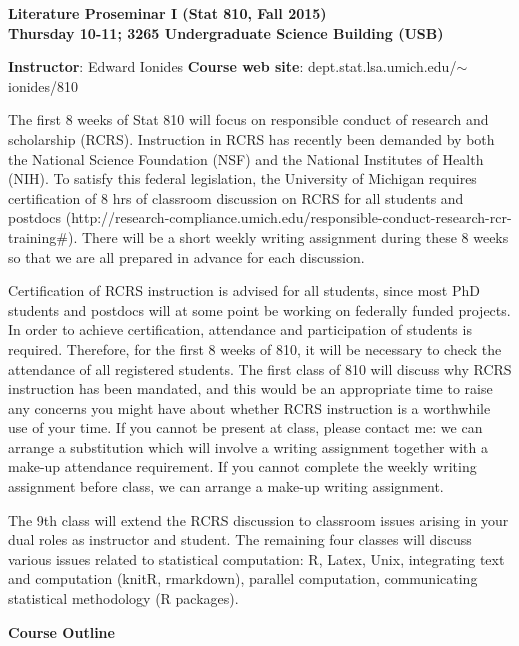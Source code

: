 \documentclass[11pt]{article}\usepackage[]{graphicx}\usepackage[]{color}
\begin{document}
\begin{center}\bf\Large
Literature Proseminar I (Stat 810, Fall 2015) \\
\rm \normalsize Thursday 10-11; 3265 Undergraduate Science Building (USB)
\end{center}
{\bf Instructor}: Edward Ionides \hfill
{\bf Course web site}: dept.stat.lsa.umich.edu/$\sim$ionides/810


\vspace{3mm}

The first 8 weeks of Stat 810 will focus on responsible conduct of research and scholarship (RCRS). Instruction in RCRS has recently been demanded by both the National Science Foundation (NSF) and the National Institutes of Health (NIH). To satisfy this federal legislation, the University of Michigan requires certification of 8 hrs of classroom discussion on RCRS for all students and postdocs (http://research-compliance.umich.edu/responsible-conduct-research-rcr-training\#). There will be a short weekly writing assignment during these 8 weeks so that we are all prepared in advance for each discussion.

 Certification of RCRS instruction is advised for all students, since most PhD students and postdocs will at some point be working on federally funded projects. In order to achieve certification, attendance and participation of students is required. Therefore, for the first 8 weeks of 810, it will be necessary to check the attendance of all registered students. The first class of 810 will discuss why RCRS instruction has been mandated, and this would be an appropriate time to raise any concerns you might have about whether RCRS instruction is a worthwhile use of your time. If you cannot be present at class, please contact me: we can arrange a substitution which will involve a writing assignment together with a make-up attendance requirement. If you cannot complete the weekly writing assignment before class, we can arrange a make-up writing assignment.

The 9th class will extend the RCRS discussion to classroom issues arising in your dual roles as instructor and student. The remaining four classes will discuss various issues related to statistical computation: R, Latex, Unix, integrating text and computation (knitR, rmarkdown), parallel computation, communicating statistical methodology (R packages).


{\bf %
Course Outline}
\end{document}
